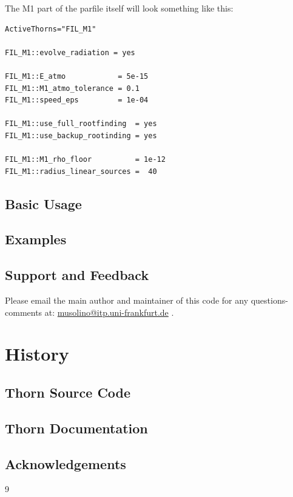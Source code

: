 The M1 part of the parfile itself will look something like this:
\begin{verbatim}
ActiveThorns="FIL_M1"

FIL_M1::evolve_radiation = yes

FIL_M1::E_atmo            = 5e-15
FIL_M1::M1_atmo_tolerance = 0.1
FIL_M1::speed_eps         = 1e-04

FIL_M1::use_full_rootfinding  = yes
FIL_M1::use_backup_rootinding = yes

FIL_M1::M1_rho_floor          = 1e-12
FIL_M1::radius_linear_sources =  40
\end{verbatim}

\subsection{Basic Usage}


\subsection{Examples}

\subsection{Support and Feedback}
Please email the main author and maintainer of this code for any questions-comments at: \href{mailto:musolino@itp.uni-frankfurt.de}{musolino@itp.uni-frankfurt.de} .

\section{History}

\subsection{Thorn Source Code}

\subsection{Thorn Documentation}

\subsection{Acknowledgements}


\begin{thebibliography}{9}

\end{thebibliography}



